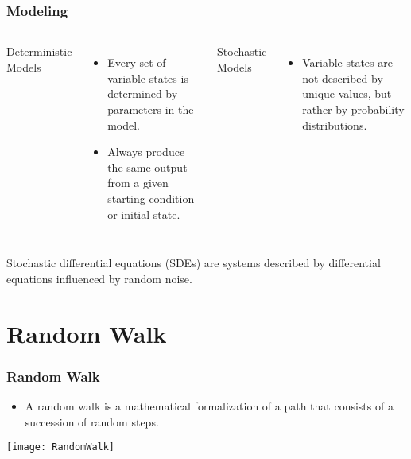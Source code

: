 \begin{frame}
\frametitle{Modeling}
\begin{columns}[t]
Deterministic Models
\begin{itemize}
\item Every set of variable states is determined by parameters in the model.
\item Always produce the same output from a given starting condition or initial state.
\end{itemize}

Stochastic Models
\begin{itemize}
\item Variable states are not described by unique values, but rather by probability distributions.
\end{itemize}
\end{columns}

\bigskip
\centering
 Stochastic differential equations (SDEs) are systems described by differential equations influenced by random noise.
\end{frame}

\section{Random Walk}
\begin{frame}
  \frametitle{Random Walk}
  \begin{itemize}
  \item A random walk is a mathematical formalization of a path that consists of a succession of random steps.
  \end{itemize}
  \centering
  \texttt{[image: RandomWalk]}
\end{frame}

